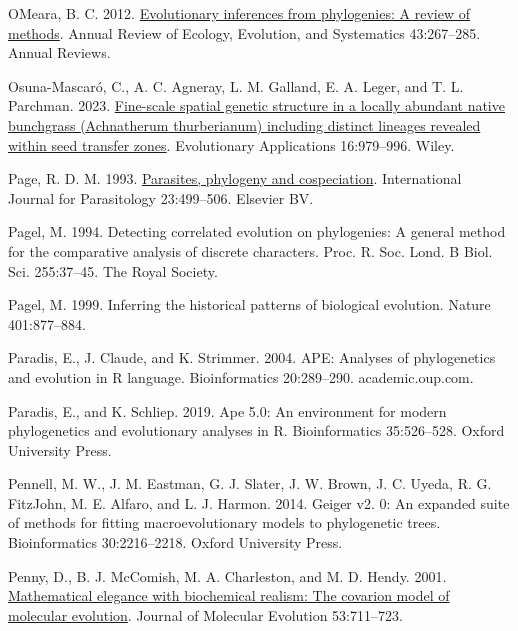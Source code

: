 \documentclass[fleqn,10pt,lineno]{wlpeerj} %
\newlength{\cslhangindent}
\newlength{\cslentryspacingunit} %
\newenvironment{CSLReferences}[2] %
 {%
  \setlength{\parindent}{0pt}
  \ifodd #1
  \let\oldpar\par
  \def\par{\hangindent=\cslhangindent\oldpar}
  \fi
  \setlength{\parskip}{#2\cslentryspacingunit}
 }%
 {}
\begin{document}
\begin{CSLReferences}{1}{0}
\leavevmode{}%
OMeara, B. C. 2012. \href{https://doi.org/10.1146/annurev-ecolsys-110411-160331}{Evolutionary inferences from phylogenies: A review of methods}. Annual Review of Ecology, Evolution, and Systematics 43:267--285. Annual Reviews.

\leavevmode{}%
Osuna-Mascaró, C., A. C. Agneray, L. M. Galland, E. A. Leger, and T. L. Parchman. 2023. \href{https://doi.org/10.1111/eva.13547}{Fine-scale spatial genetic structure in a locally abundant native bunchgrass ({Achnatherum thurberianum}) including distinct lineages revealed within seed transfer zones}. Evolutionary Applications 16:979--996. Wiley.

\leavevmode{}%
Page, R. D. M. 1993. \href{https://doi.org/10.1016/0020-7519(93)90039-2}{Parasites, phylogeny and cospeciation}. International Journal for Parasitology 23:499--506. Elsevier {BV}.

\leavevmode{}%
Pagel, M. 1994. Detecting correlated evolution on phylogenies: A general method for the comparative analysis of discrete characters. Proc. R. Soc. Lond. B Biol. Sci. 255:37--45. The Royal Society.

\leavevmode{}%
Pagel, M. 1999. Inferring the historical patterns of biological evolution. Nature 401:877--884.

\leavevmode{}%
Paradis, E., J. Claude, and K. Strimmer. 2004. {APE}: Analyses of phylogenetics and evolution in {R} language. Bioinformatics 20:289--290. academic.oup.com.

\leavevmode{}%
Paradis, E., and K. Schliep. 2019. Ape 5.0: An environment for modern phylogenetics and evolutionary analyses in {R}. Bioinformatics 35:526--528. Oxford University Press.

\leavevmode{}%
Pennell, M. W., J. M. Eastman, G. J. Slater, J. W. Brown, J. C. Uyeda, R. G. FitzJohn, M. E. Alfaro, and L. J. Harmon. 2014. Geiger v2. 0: An expanded suite of methods for fitting macroevolutionary models to phylogenetic trees. Bioinformatics 30:2216--2218. Oxford University Press.

\leavevmode{}%
Penny, D., B. J. McComish, M. A. Charleston, and M. D. Hendy. 2001. \href{https://doi.org/10.1007/s002390010258}{Mathematical elegance with biochemical realism: The covarion model of molecular evolution}. Journal of Molecular Evolution 53:711--723.


\end{CSLReferences}
\end{document}
